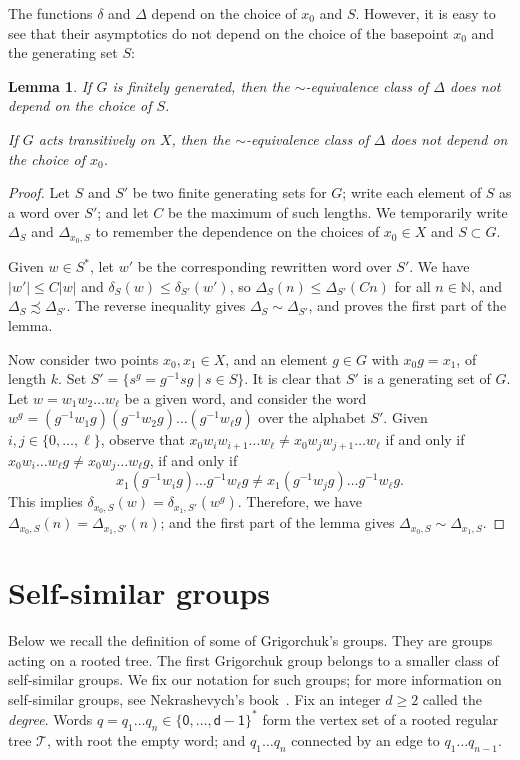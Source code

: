 \documentclass{amsart}
\newcommand\N{\mathbb{N}}
\newtheorem{lemma}{Lemma}[section]
\theoremstyle{definition}
\begin{document}
The functions $\delta$ and $\Delta$ depend on the choice of $x_0$ and
$S$. However, it is easy to see that their asymptotics do not depend
on the choice of the basepoint $x_0$ and the generating set $S$:
\begin{lemma}\label{le:indepbasepoint}
  If $G$ is finitely generated, then the $\sim$-equivalence class of
  $\Delta$ does not depend on the choice of $S$.

  If $G$ acts transitively on $X$, then the $\sim$-equivalence class
  of $\Delta$ does not depend on the choice of $x_0$.
\end{lemma}
\begin{proof}
  Let $S$ and $S'$ be two finite generating sets for $G$; write each
  element of $S$ as a word over $S'$; and let $C$ be the maximum of
  such lengths. We temporarily write $\Delta_S$ and $\Delta_{x_0,S}$
  to remember the dependence on the choices of $x_0\in X$ and
  $S\subset G$.

  Given $w\in S^*$, let $w'$ be the corresponding rewritten word over
  $S'$. We have $|w'|\le C|w|$ and $\delta_S(w)\le\delta_{S'}(w')$, so
  $\Delta_S(n)\le\Delta_{S'}(Cn)$ for all $n\in\N$, and
  $\Delta_S\precsim\Delta_{S'}$. The reverse inequality gives
  $\Delta_S\sim\Delta_{S'}$, and proves the first part of the lemma.

  Now consider two points $x_0,x_1\in X$, and an element $g\in G$ with
  $x_0g=x_1$, of length $k$. Set $S'=\{s^g =g^{-1}sg \mid s\in S\}$.
  It is clear that $S'$ is a generating set of $G$.  Let $w=w_1w_2
  \dots w_\ell$ be a given word, and consider the word $w^g = (g^{-1}
  w_1 g) (g^{-1} w_2 g) \dots (g^{-1} w_\ell g)$ over the alphabet
  $S'$.  Given $i,j\in\{0,\dots,\ell\}$, observe that $x_0 w_i w_{i+1}
  \dots w_\ell \ne x_0 w_j w_{j+1} \dots w_\ell$ if and only if $x_0
  w_i\dots w_\ell g \ne x_0 w_j\dots w_\ell g$, if and only if
  \[
  x_1 (g^{-1}w_ig)\dots g^{-1}w_\ell g \neq x_1 (g^{-1}w_jg)\dots g^{-1}w_\ell g.
  \]
  This implies $\delta_{x_0,S}(w)=\delta_{x_1,S'}(w^g)$. Therefore, we
  have $\Delta_{x_0,S}(n)=\Delta_{x_1,S'}(n)$; and the first part of
  the lemma gives $\Delta_{x_0,S}\sim\Delta_{x_1,S}$.
\end{proof}

\section{Self-similar groups}
Below we recall the definition of some of Grigorchuk's groups. They
are groups acting on a rooted tree. The first Grigorchuk group belongs
to a smaller class of self-similar groups.  We fix our notation for
such groups; for more information on self-similar groups, see
Nekrashevych's book~\cite{nekrashevych:ssg}. Fix an integer $d\ge2$
called the \emph{degree}. Words
$q=q_1\dots q_n\in\{\mathsf0,\dots,\mathsf{d-1}\}^*$ form the vertex set of a
rooted regular tree $\mathcal T$, with root the empty word; and
$q_1\dots q_n$ connected by an edge to $q_1\dots q_{n-1}$.
\end{document}
